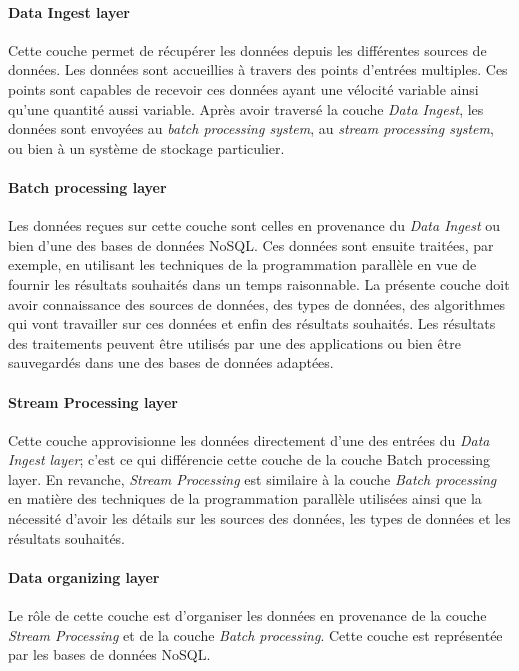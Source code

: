 		\paragraph{Data Ingest layer} Cette couche permet de récupérer les données depuis les différentes sources de données. Les données sont accueillies à travers des points d'entrées multiples. Ces points  sont capables de recevoir  ces données ayant une vélocité variable ainsi qu'une quantité aussi variable.  Après avoir traversé  la couche \textit{Data Ingest}, les données sont envoyées au \textit{batch processing system}, au \textit{stream processing system}, ou bien à un système de stockage particulier.
		\paragraph{Batch processing layer} Les données reçues sur cette couche sont celles en provenance du \textit{Data Ingest} ou bien d'une des bases de données NoSQL. Ces données sont ensuite traitées, par exemple, en utilisant les techniques de la programmation parallèle en vue de fournir les résultats souhaités dans un temps raisonnable. La présente couche doit avoir connaissance des sources de données, des types de données, des algorithmes qui vont travailler sur ces données et enfin des résultats souhaités. Les résultats des traitements peuvent être utilisés par une des applications ou bien être sauvegardés dans une des bases de données adaptées.\par
		\paragraph{Stream Processing layer} Cette couche approvisionne les données directement d'une des entrées du \textit{Data Ingest layer}; c'est ce qui différencie cette couche de la couche Batch processing layer. En revanche, \textit{Stream Processing} est similaire à la couche   \textit{Batch processing} en matière  des techniques de la programmation parallèle utilisées ainsi que la nécessité d'avoir les détails sur les sources des données, les types de données et les résultats souhaités.\par
		\paragraph{Data organizing layer} Le rôle de cette couche est d'organiser les données en provenance de la  couche  \textit{Stream Processing} et de la couche \textit{Batch processing}. Cette couche est représentée par les bases de données NoSQL. 
